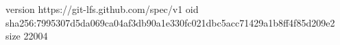 version https://git-lfs.github.com/spec/v1
oid sha256:7995307d5da069ca04af3db90a1e330fc021dbc5acc71429a1b8ff4f85d209e2
size 22004
